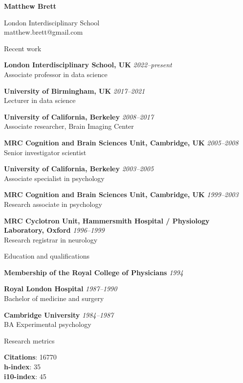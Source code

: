 \documentclass[11pt]{cv}
\newcommand{\PlaceDate}[2]{{\bf #1} \hfill {\em #2} \\}
\newcommand{\PlaceDateNote}[3]{{\bf #1} \hfill {\em #2} \\#3}
\newcommand{\LIS}{London Interdisciplinary School, UK}
\newcommand{\UoB}{University of Birmingham, UK}
\newcommand{\UCB}{University of California, Berkeley}
\newcommand{\CBU}{MRC Cognition and Brain Sciences Unit, Cambridge, UK}
\begin{document}
{\huge \bf Matthew Brett}

London Interdisciplinary School \\
matthew.brett@gmail.com

\begin{cvSection}{Recent work}

\PlaceDateNote{\LIS}{2022--present }{
    Associate professor in data science}

\PlaceDateNote{\UoB}{2017--2021 }{
    Lecturer in data science}

\PlaceDateNote{\UCB}{2008--2017 }{
    Associate researcher, Brain Imaging Center}

\PlaceDateNote{\CBU}{2005--2008}{
    Senior investigator scientist}

\PlaceDateNote{\UCB}{2003--2005 }{
    Associate specialist in psychology}

\PlaceDateNote{\CBU}{1999--2003 }{
    Research associate in psychology}

\PlaceDateNote{
MRC Cyclotron Unit, Hammersmith Hospital / Physiology Laboratory, Oxford}
{1996--1999}
    {Research registrar in neurology}

\end{cvSection}

\begin{cvSection}{Education and qualifications}

{\bf Membership of the Royal College of Physicians} \hfill {\em 1994}

\PlaceDate{Royal London Hospital}{1987--1990 }
Bachelor of medicine and surgery

\PlaceDateNote{Cambridge University}{1984--1987 }{
BA Experimental psychology}

\end{cvSection}

\begin{cvSection}{Research metrics}

{\bf Citations}: 16770 \\
{\bf h-index}: 35 \\
{\bf i10-index}: 45

\end{cvSection}
\end{document}
